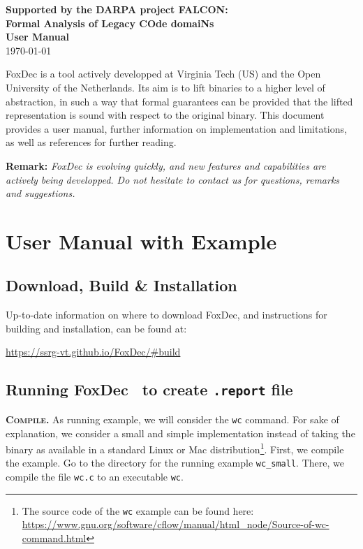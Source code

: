 \documentclass[12pt,a4paper]{article}
\newcommand{\foxdec}{\textsf{FoxDec}}
\newcommand{\beginpar}[1]{\noindent\textsc{\textbf{#1.}}}
\newcounter{example}
\begin{document}
\begin{titlepage}
\vspace{15mm}

\textbf{Supported by the DARPA project FALCON: \\ Formal Analysis of Legacy COde domaiNs}\\
\bigskip
\Large {\color{BleuFonce} \textbf{User Manual}}
\\
\normalsize {\today}



\end{titlepage}

\restoregeometry
\newpage

\setcounter{page}{1} 

FoxDec is a tool actively developped at Virginia Tech (US) and the Open University of the Netherlands.
Its aim is to lift binaries to a higher level of abstraction, in such a way that formal guarantees can be provided that the lifted representation is sound with respect to the original binary.
This document provides a user manual, further information on implementation and limitations, as well as references for further reading.

\textbf{Remark:}
\textit{
FoxDec is evolving quickly, and new features and capabilities are actively being developped.
Do not hesitate to contact us for questions, remarks and suggestions.
}


\section{User Manual with Example}


\subsection{Download, Build \& Installation}

Up-to-date information on where to download \foxdec, and instructions for building and installation, can be found at:
\begin{center}
\url{https://ssrg-vt.github.io/FoxDec/#build}
\end{center}


\subsection{Running \foxdec~ to create \texttt{.report} file}

\beginpar{Compile} As running example, we will consider the \texttt{wc} command.
For sake of explanation, we consider a small and simple implementation instead of taking the binary as available in a standard Linux or Mac distribution\footnote{The source code of the \texttt{wc} example can be found here:\\\url{https://www.gnu.org/software/cflow/manual/html_node/Source-of-wc-command.html}}.
First, we compile the example. 
Go to the directory for the running example \texttt{wc\_small}.
There, we compile the file \texttt{wc.c} to an executable \texttt{wc}.
\end{document}
